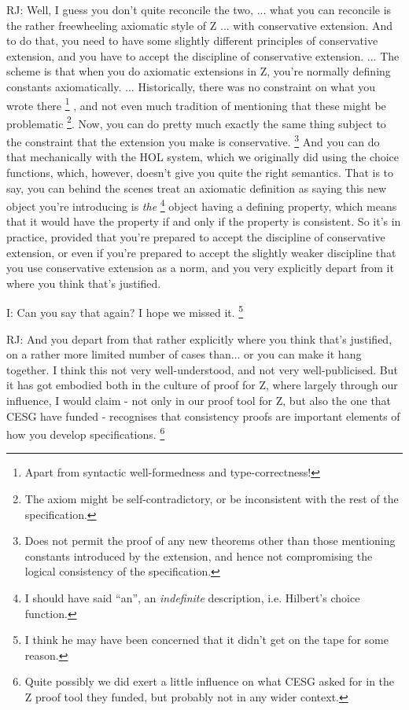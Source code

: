 \documentclass[10pt,titlepage]{book}
\begin{document}
RJ: Well, I guess you don't quite reconcile the two, ... what you can reconcile is the rather freewheeling axiomatic style of Z ... with conservative extension.
And to do that, you need to have some slightly different principles of conservative extension, and you have to accept the discipline of conservative extension.
...
The scheme is that when you do axiomatic extensions in Z, you're normally defining constants axiomatically.
...
Historically, there was no constraint on what you wrote there%
\footnote{
Apart from syntactic well-formedness and type-correctness!}%
, and not even much tradition of mentioning that these might be problematic%
\footnote{
The axiom might be self-contradictory, or be inconsistent with the rest of the specification.
}.
Now, you can do pretty much exactly the same thing subject to the constraint that the extension you make is conservative.%
\footnote{
Does not permit the proof of any new theorems other than those mentioning constants introduced by the extension, and hence not compromising the logical consistency of the specification.}
And you can do that mechanically with the HOL system, which we originally did using the choice functions, which, however, doesn't give you quite the right semantics.
That is to say, you can behind the scenes treat an axiomatic definition as saying this new object you're introducing is {\it the}%
\footnote{I should have said ``an'', an \emph{indefinite} description, i.e. Hilbert's choice function.}%
 object having a defining property, which means that it would have the property if and only if the property is consistent.
So it's in practice, provided that you're prepared to accept the discipline of conservative extension, or even if you're prepared to accept the slightly weaker discipline that you use conservative extension as a norm, and you very explicitly depart from it where you think that's justified.

I: Can you say that again?
I hope we missed it.
\footnote{I think he may have been concerned that it didn't get on the tape for some reason.}

RJ: And you depart from that rather explicitly where you think that's justified, on a rather more limited number of cases than... or you can make it hang together.
I think this not very well-understood, and not very well-publicised.
But it has got embodied both in the culture of proof for Z, where largely through our influence, I would claim - not only in our proof tool for Z, but also the one that CESG have funded - recognises that consistency proofs are important elements of how you develop specifications.
\footnote{Quite possibly we did exert a little influence on what CESG asked for in the Z proof tool they funded, but probably not in any wider context.}
\end{document}
